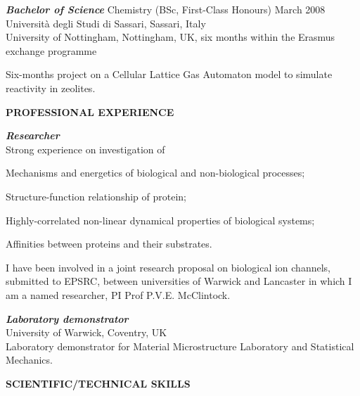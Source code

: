 \documentclass[a4paper,10pt,final]{letter}
\newcommand{\Sep}{\vspace{1em}}
\newcommand{\SmallSep}{\vspace{0.4em}}
\newcommand{\CVSection}[1]
	{\Large\textbf{#1}\par
	\SmallSep\normalsize\normalfont}
\newcommand{\CVItem}[2]
	{\textit{\textbf{\color{RoyalBlue} #1}} #2}
\begin{document}
\CVItem{Bachelor of Science}{Chemistry (BSc, First-Class Honours) \hfill  March 2008}\\
Universit\`a degli Studi di Sassari, Sassari, Italy\\
University of Nottingham, Nottingham, UK, six months within the Erasmus exchange programme  %
\begin{description}[style=multiline,leftmargin=2.6cm,font=\normalfont,topsep=0.1cm,,itemsep=-3.5pt]
\item [Final project:] Six-months project on a Cellular Lattice Gas Automaton model to simulate
  reactivity in zeolites.
\end{description}


\Sep
\CVSection{PROFESSIONAL EXPERIENCE}
\CVItem{Researcher} \\
Strong experience on investigation of 
\begin{compactitem}[\color{RoyalBlue}$\circ$] 
\item Mechanisms and energetics of biological and non-biological processes;
\item Structure-function relationship of protein;
\item Highly-correlated non-linear dynamical properties of biological systems;
\item Affinities between proteins and their substrates.
\end{compactitem}

I have been involved in a joint research proposal on biological ion channels, submitted to
EPSRC, between universities of Warwick and Lancaster in which I am a named researcher, PI
Prof P.V.E. McClintock.

\SmallSep
\CVItem{Laboratory demonstrator} \\ %
University of Warwick, Coventry, UK  \\
Laboratory demonstrator for Material Microstructure Laboratory and Statistical Mechanics. 


\Sep
\CVSection{SCIENTIFIC/TECHNICAL SKILLS}
\end{document}
